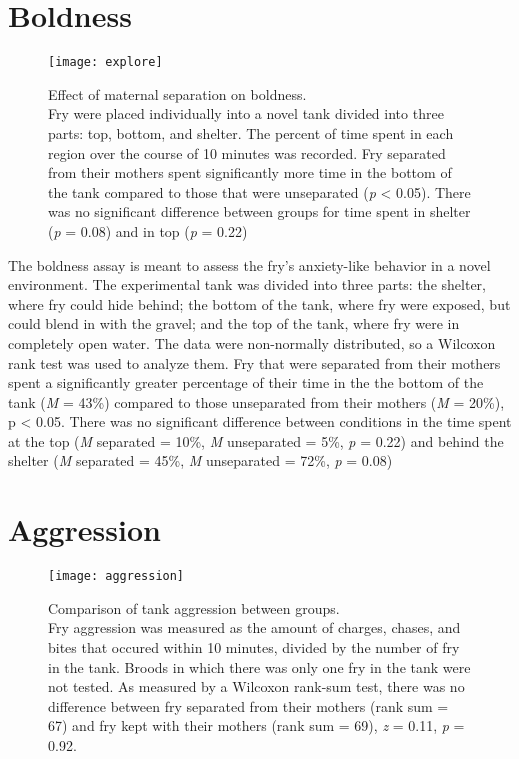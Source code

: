 \documentclass[12pt,twoside]{reedthesis}
\begin{document}
\section{Boldness}

\begin{figure}[htbp] 
\begin{center} 
\texttt{[image: explore]}
\caption[Effect of maternal separation on boldness]{\footnotesize{Effect of
    maternal separation on boldness.\\ Fry were placed individually into a novel tank
    divided into three parts: top, bottom, and shelter. The percent of time
    spent in each region over the course of 10 minutes was recorded. Fry
    separated from their mothers spent significantly more time in the bottom of
    the tank compared to those that were unseparated (\textit{p} < 0.05). There was
    no significant difference between groups for time spent in shelter
    (\textit{p} = 0.08) and in top (\textit{p} = 0.22)}}
\label{subd}
\end{center} 
\end{figure}

The boldness assay is meant to assess the fry's anxiety-like behavior in a novel
environment. The experimental tank was divided into three parts: the shelter,
where fry could hide behind; the bottom of the tank, where fry were exposed, but
could blend in with the gravel; and the top of the tank, where fry were in
completely open water. The data were non-normally distributed, so a Wilcoxon
rank test was used to analyze them. Fry that were separated from their mothers spent a
significantly greater percentage of their time in the the bottom of the tank
(\textit{M} = 43\%) compared to those unseparated from their mothers (\textit{M}
= 20\%), p < 0.05. There was no significant difference between conditions in the
time spent at the top (\textit{M} separated = 10\%, \textit{M} unseparated =
5\%, \textit{p} = 0.22) and behind the shelter (\textit{M} separated = 45\%,
\textit{M} unseparated = 72\%, \textit{p} = 0.08) 

\section{Aggression}
\begin{figure}[htbp] 
\begin{center} 
\texttt{[image: aggression]}
\caption[Comparison of tank aggression between
groups]{\footnotesize{Comparison of tank aggression between groups.\\ Fry aggression was measured
  as the amount of charges, chases, and bites that occured within 10 minutes,
  divided by the number of fry in the tank. Broods in which there was only one
  fry in the tank were not tested. As measured by a Wilcoxon rank-sum test,
  there was no difference between fry separated from their mothers (rank sum =
  67) and fry kept with their mothers (rank sum = 69), \textit{z} = 0.11,
  \textit{p} = 0.92}.}
\label{subd}
\end{center} 
\end{figure}
\end{document}
